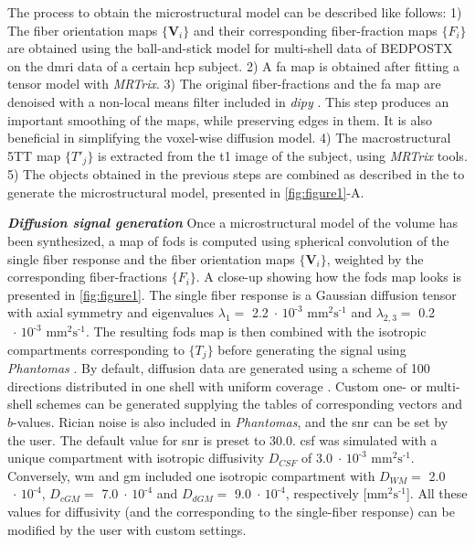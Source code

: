 \documentclass[english]{frontiers/frontiersSCNS} %
\newcommand{\e}[1]{\ensuremath{\;\cdot\,\text{10}^\text{#1}}}
\newcommand{\diffunits}{\ensuremath{\text{mm}^2\text{s}^{\text{-1}}}}
\begin{document}
The process to obtain the microstructural model can be described like follows:
1) The fiber orientation maps $\{\mathbf{V}_i\}$ and their corresponding fiber-fraction maps $\{F_i\}$ are
  obtained using the ball-and-stick model for multi-shell data of BEDPOSTX \citep{jbabdi_modelbased_2012}
  on the \gls*{dmri} data of a certain \gls*{hcp} subject.
2) A \gls*{fa} map is obtained after fitting a tensor model with \emph{MRTrix}.
3) The original fiber-fractions and the \gls*{fa} map are denoised with a non-local means filter included
  in \emph{dipy} \citep{garyfallis_dipy_2011}.
This step produces an important smoothing of the maps, while preserving edges in them.
It is also beneficial in simplifying the voxel-wise diffusion model.
4) The macrostructural 5TT map $\{T'_j\}$ is extracted from the \acrlong*{t1} image of the subject, using \emph{MRTrix} tools.
5) The objects obtained in the previous steps are combined as described in the  to generate the
  microstructural model, presented in \autoref{fig:figure1}-A.

\noindent\textbf{\textit{Diffusion signal generation\textcolon}\label{sec:data_dwi}} %
Once a microstructural model of the volume has been synthesized, a map of \glspl{fod} is computed using spherical
  convolution of the single fiber response and the fiber orientation maps $\{\mathbf{V}_i\}$, weighted by the
  corresponding fiber-fractions $\{F_i\}$.
A close-up showing how the \glspl{fod} map looks is presented in \autoref{fig:figure1}.
The single fiber response is a Gaussian diffusion tensor with axial symmetry and eigenvalues $\lambda_1=$ 2.2\e{-3}
  \diffunits{} and $\lambda_{2,3}=$ 0.2\e{-3} \diffunits{}.
The resulting \glspl{fod} map is then combined with the isotropic compartments corresponding to $\{T_j\}$
  before generating the signal using \emph{Phantomas} \citep{caruyer_phantomas_2014}.
By default, diffusion data are generated using a scheme of 100 directions distributed in one shell with uniform
  coverage \citep{caruyer_design_2013}.
Custom one- or multi-shell schemes can be generated supplying the tables of corresponding vectors and $b$-values.
Rician noise is also included in \emph{Phantomas}, and the \gls*{snr} can be set by the user.
The default value for \gls*{snr} is preset to 30.0.
\Gls*{csf} was simulated with a unique compartment with isotropic diffusivity $D_{CSF}$ of 3.0\e{-3} \diffunits{}.
Conversely, \Gls*{wm} and \gls*{gm} included one isotropic compartment with $D_{WM} =$ 2.0\e{-4}, $D_{cGM} =$ 7.0\e{-4}
  and $D_{dGM} =$ 9.0\e{-4}, respectively [\diffunits{}].
All these values for diffusivity (and the corresponding to the single-fiber response) can be modified by the user with
  custom settings.
\end{document}

